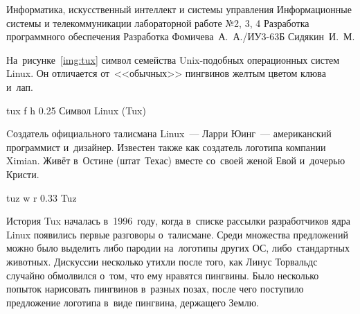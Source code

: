 \documentclass{bmstu}
\begin{document}



\makereporttitle
    {Информатика, искусственный интеллект и системы управления} %
    {Информационные системы и телекоммуникации} %
    {лабораторной работе №2, 3, 4} %
    {Разработка программного обеспечения} %
    {Разработка} %
    {} %
    {Фомичева~А.~А./ИУ3-63Б} %
    {Сидякин~И.~М.} %






На~рисунке~\ref{img:tux} символ семейства Unix-подобных операционных систем Linux.
Он отличается от~<<обычных>> пингвинов желтым цветом клюва и~лап.

    {tux} %
    {f} %
    {h} %
    {0.25\textwidth} %
    {Символ Linux (Tux)} %

Cоздатель официального талисмана Linux~--- Ларри Юинг~--- американский программист и~дизайнер.
Известен также как создатель логотипа компании Ximian.
Живёт в~Остине (штат~Техас) вместе со~своей женой Евой и~дочерью Кристи.


    {tuz} %
    {w} %
    {r} %
    {0.33\textwidth} %
    {Tuz} %

История Tux началась в~1996~году, когда в~списке рассылки разработчиков ядра Linux появились первые разговоры о~талисмане.
Среди множества предложений можно было выделить либо пародии на~логотипы других ОС, либо~стандартных животных.
Дискуссии несколько утихли после того, как Линус Торвальдс случайно обмолвился о~том, что ему нравятся пингвины.
Было несколько попыток нарисовать пингвинов в~разных позах, после чего поступило предложение логотипа в~виде пингвина, держащего Землю.
\end{document}
